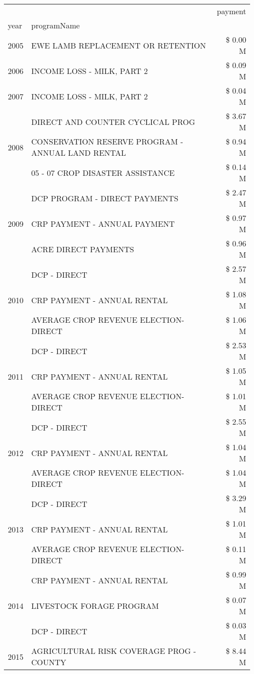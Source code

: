 \begin{tabular}{llr}
\toprule
 &  & payment \\
year & programName &  \\
\midrule
2005 & EWE LAMB REPLACEMENT OR RETENTION & \$ 0.00 M \\
\cline{1-3}
2006 & INCOME LOSS - MILK, PART 2 & \$ 0.09 M \\
\cline{1-3}
2007 & INCOME LOSS - MILK, PART 2 & \$ 0.04 M \\
\cline{1-3}
\multirow[t]{3}{*}{2008} & DIRECT AND COUNTER CYCLICAL PROG & \$ 3.67 M \\
 & CONSERVATION RESERVE PROGRAM - ANNUAL LAND RENTAL & \$ 0.94 M \\
 & 05 - 07 CROP DISASTER ASSISTANCE & \$ 0.14 M \\
\cline{1-3}
\multirow[t]{3}{*}{2009} & DCP PROGRAM - DIRECT PAYMENTS & \$ 2.47 M \\
 & CRP PAYMENT - ANNUAL PAYMENT & \$ 0.97 M \\
 & ACRE DIRECT PAYMENTS & \$ 0.96 M \\
\cline{1-3}
\multirow[t]{3}{*}{2010} & DCP - DIRECT & \$ 2.57 M \\
 & CRP PAYMENT - ANNUAL RENTAL & \$ 1.08 M \\
 & AVERAGE CROP REVENUE ELECTION-DIRECT & \$ 1.06 M \\
\cline{1-3}
\multirow[t]{3}{*}{2011} & DCP - DIRECT & \$ 2.53 M \\
 & CRP PAYMENT - ANNUAL RENTAL & \$ 1.05 M \\
 & AVERAGE CROP REVENUE ELECTION-DIRECT & \$ 1.01 M \\
\cline{1-3}
\multirow[t]{3}{*}{2012} & DCP - DIRECT & \$ 2.55 M \\
 & CRP PAYMENT - ANNUAL RENTAL & \$ 1.04 M \\
 & AVERAGE CROP REVENUE ELECTION-DIRECT & \$ 1.04 M \\
\cline{1-3}
\multirow[t]{3}{*}{2013} & DCP - DIRECT & \$ 3.29 M \\
 & CRP PAYMENT - ANNUAL RENTAL & \$ 1.01 M \\
 & AVERAGE CROP REVENUE ELECTION-DIRECT & \$ 0.11 M \\
\cline{1-3}
\multirow[t]{3}{*}{2014} & CRP PAYMENT - ANNUAL RENTAL & \$ 0.99 M \\
 & LIVESTOCK FORAGE PROGRAM & \$ 0.07 M \\
 & DCP - DIRECT & \$ 0.03 M \\
\cline{1-3}
\multirow[t]{3}{*}{2015} & AGRICULTURAL RISK COVERAGE PROG - COUNTY & \$ 8.44 M \\

\end{tabular}

